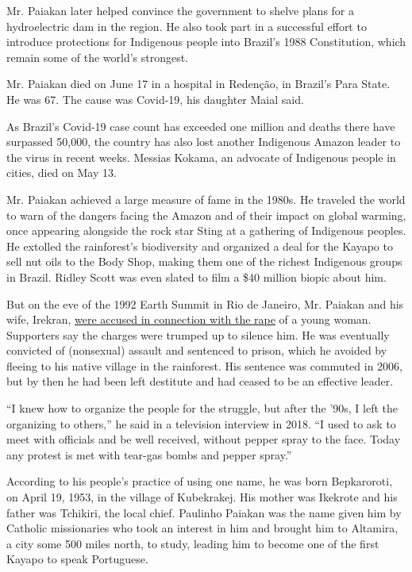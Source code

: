 Mr. Paiakan later helped convince the government to shelve plans for a
hydroelectric dam in the region. He also took part in a successful
effort to introduce protections for Indigenous people into Brazil's 1988
Constitution, which remain some of the world's strongest.

Mr. Paiakan died on June 17 in a hospital in Redenção, in Brazil's Para
State. He was 67. The cause was Covid-19, his daughter Maial said.

As Brazil's Covid-19 case count has exceeded one million and deaths
there have surpassed 50,000, the country has also lost another
Indigenous Amazon leader to the virus in recent weeks. Messias Kokama,
an advocate of Indigenous people in cities, died on May 13.

Mr. Paiakan achieved a large measure of fame in the 1980s. He traveled
the world to warn of the dangers facing the Amazon and of their impact
on global warming, once appearing alongside the rock star Sting at a
gathering of Indigenous peoples. He extolled the rainforest's
biodiversity and organized a deal for the Kayapo to sell nut oils to the
Body Shop, making them one of the richest Indigenous groups in Brazil.
Ridley Scott was even slated to film a \$40 million biopic about him.

But on the eve of the 1992 Earth Summit in Rio de Janeiro, Mr. Paiakan
and his wife, Irekran,
\href{https://www.nytimes.com/1992/07/05/world/indian-white-rape-case-splits-brazil.html}{were
accused in connection with the rape} of a young woman. Supporters say
the charges were trumped up to silence him. He was eventually convicted
of (nonsexual) assault and sentenced to prison, which he avoided by
fleeing to his native village in the rainforest. His sentence was
commuted in 2006, but by then he had been left destitute and had ceased
to be an effective leader.

``I knew how to organize the people for the struggle, but after the
'90s, I left the organizing to others,'' he said in a television
interview in 2018. ``I used to ask to meet with officials and be well
received, without pepper spray to the face. Today any protest is met
with tear-gas bombs and pepper spray.''

According to his people's practice of using one name, he was born
Bepkaroroti, on April 19, 1953, in the village of Kubekrakej. His mother
was Ikekrote and his father was Tchikiri, the local chief. Paulinho
Paiakan was the name given him by Catholic missionaries who took an
interest in him and brought him to Altamira, a city some 500 miles
north, to study, leading him to become one of the first Kayapo to speak
Portuguese.

